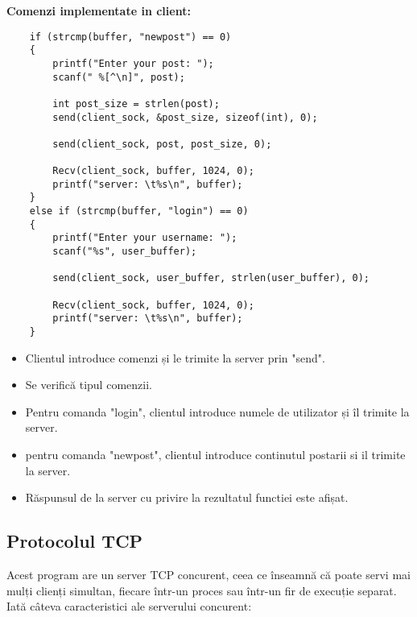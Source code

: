 \documentclass{article}
\begin{document}
\newpage

\begin{mdframed}
    [linewidth=1pt, linecolor=black, topline=true, rightline=true, bottomline=true, leftline=true]
    \textbf{Comenzi implementate in client:}
    \begin{verbatim}
    if (strcmp(buffer, "newpost") == 0)
    {
        printf("Enter your post: ");
        scanf(" %[^\n]", post);

        int post_size = strlen(post);
        send(client_sock, &post_size, sizeof(int), 0);

        send(client_sock, post, post_size, 0);

        Recv(client_sock, buffer, 1024, 0);
        printf("server: \t%s\n", buffer);
    }
    else if (strcmp(buffer, "login") == 0)
    {
        printf("Enter your username: ");
        scanf("%s", user_buffer);

        send(client_sock, user_buffer, strlen(user_buffer), 0);

        Recv(client_sock, buffer, 1024, 0);
        printf("server: \t%s\n", buffer);
    }
    \end{verbatim}

\end{mdframed}

\begin{itemize}

    \item Clientul introduce comenzi și le trimite la server prin "send".
    \item Se verifică tipul comenzii.
    \item Pentru comanda "login", clientul introduce numele de utilizator și îl trimite la server.
    \item pentru comanda "newpost", clientul introduce continutul postarii si il trimite la server.
    \item Răspunsul de la server cu privire la rezultatul functiei este afișat.

\end{itemize}

\subsection{Protocolul TCP}
Acest program are un server TCP concurent, ceea ce înseamnă că poate servi mai mulți clienți simultan, fiecare într-un proces sau într-un fir de execuție separat.
Iată câteva caracteristici ale serverului concurent:
\end{document}
